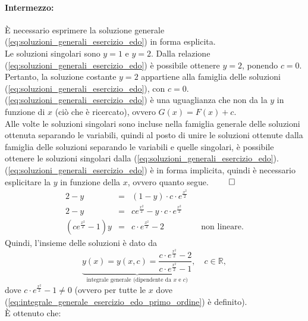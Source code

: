 \begin{example}
\begin{enumerate}
    \paragraph{Intermezzo:} È necessario esprimere la soluzione generale (\ref{eq:soluzioni_generali_esercizio_edo}) in forma esplicita.\\
    Le soluzioni singolari sono $y=1$ e $y=2$. Dalla relazione (\ref{eq:soluzioni_generali_esercizio_edo}) è possibile ottenere $y=2$, ponendo $c=0$. Pertanto, la soluzione costante $y=2$ appartiene alla famiglia delle soluzioni (\ref{eq:soluzioni_generali_esercizio_edo}), con $c=0$.\\
    (\ref{eq:soluzioni_generali_esercizio_edo}) è una uguaglianza che non da la $y$ in funzione di $x$ (ciò che è ricercato), ovvero $G(x) = F(x)+c$.\\
    Alle volte le soluzioni singolari sono incluse nella famiglia generale delle soluzioni ottenuta separando le variabili, quindi al posto di unire le soluzioni ottenute dalla famiglia delle soluzioni separando le variabili e quelle singolari, è possibile ottenere le soluzioni singolari dalla (\ref{eq:soluzioni_generali_esercizio_edo}).\\
    (\ref{eq:soluzioni_generali_esercizio_edo}) è in forma implicita, quindi è necessario esplicitare la $y$ in funzione della $x$, ovvero quanto segue. $\qed$
    \begin{equation*}
        \begin{matrix}
            2-y &=& (1-y)\cdot c\cdot e^{\frac{x^2}{2}}\\
            2-y &=& ce^{\frac{x^2}{2}} - y\cdot c\cdot e^{\frac{x^2}{2}}\\
            (ce^{\frac{x^2}{2}} -1)y &=& c\cdot e^{\frac{x^2}{2}}-2 && \text{non lineare.}
        \end{matrix}
    \end{equation*}
    Quindi, l'insieme delle soluzioni è dato da
    \begin{equation}\label{eq:integrale_generale_esercizio_edo_primo_ordine}
        \underbrace{y(x) = y(x,c)=\frac{c\cdot e^{\frac{x^2}{2}}-2}{c\cdot e^{\frac{x^2}{2}}-1}}_{\text{integrale generale (dipendente da $x$ e $c$)}},\quad c\in\mathbb R,
    \end{equation}
    dove $c\cdot e^{\frac{x^2}{2}}-1\neq 0$ (ovvero per tutte le $x$ dove (\ref{eq:integrale_generale_esercizio_edo_primo_ordine}) è definito).\\
    È ottenuto che:
    \begin{itemize}

\end{itemize}
\end{enumerate}
\end{example}
